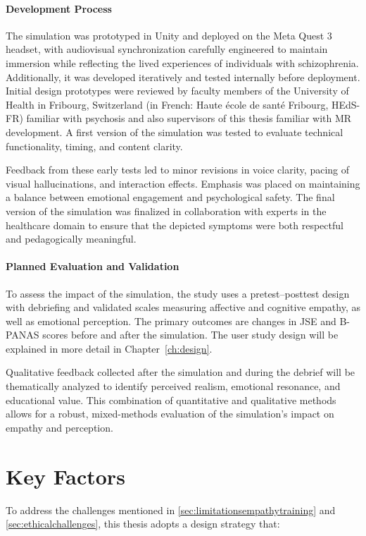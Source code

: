 \paragraph{Development Process}

The simulation was prototyped in Unity and deployed on the Meta Quest 3 headset, with audiovisual synchronization carefully engineered to maintain immersion while reflecting the lived experiences of individuals with schizophrenia. Additionally, it was developed iteratively and tested internally before deployment. Initial design prototypes were reviewed by faculty members of the University of Health in Fribourg, Switzerland (in French: Haute école de santé Fribourg, HEdS-FR) familiar with psychosis and also supervisors of this thesis familiar with MR development. A first version of the simulation was tested to evaluate technical functionality, timing, and content clarity.

\vspace{1em}

Feedback from these early tests led to minor revisions in voice clarity, pacing of visual hallucinations, and interaction effects. Emphasis was placed on maintaining a balance between emotional engagement and psychological safety. The final version of the simulation was finalized in collaboration with experts in the healthcare domain to ensure that the depicted symptoms were both respectful and pedagogically meaningful.

\paragraph{Planned Evaluation and Validation}

To assess the impact of the simulation, the study uses a pretest–posttest design with debriefing and validated scales measuring affective and cognitive empathy, as well as emotional perception. The primary outcomes are changes in JSE and B-PANAS scores before and after the simulation. The user study design will be explained in more detail in Chapter~\ref{ch:design}.

Qualitative feedback collected after the simulation and during the debrief will be thematically analyzed to identify perceived realism, emotional resonance, and educational value. This combination of quantitative and qualitative methods allows for a robust, mixed-methods evaluation of the simulation’s impact on empathy and perception.


\section{Key Factors}
To address the challenges mentioned in \ref{sec:limitationsempathytraining} and \ref{sec:ethicalchallenges}, this thesis adopts a design strategy that:

